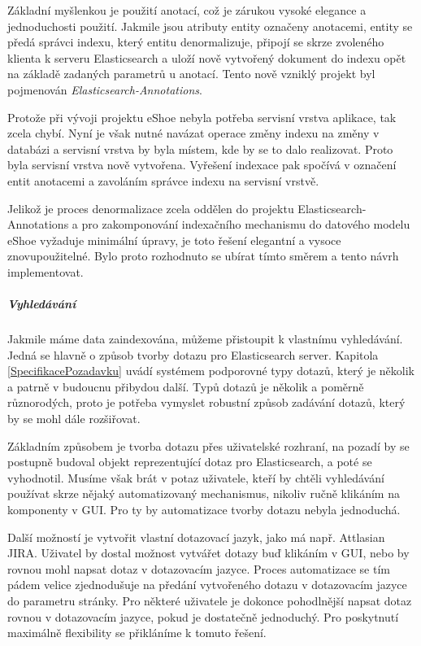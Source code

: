 \documentclass[11pt,oneside]{fithesis2}
\begin{document}
Základní myšlenkou je použití anotací, což je zárukou vysoké elegance a jednoduchosti použití. Jakmile jsou atributy entity označeny anotacemi, entity se předá správci indexu, který entitu denormalizuje, připojí se skrze zvoleného klienta k serveru Elasticsearch a uloží nově vytvořený dokument do indexu opět na základě zadaných parametrů u anotací. Tento nově vzniklý projekt byl pojmenován \emph{Elasticsearch-Annotations}.

Protože při vývoji projektu eShoe nebyla potřeba servisní vrstva aplikace, tak zcela chybí. Nyní je však nutné navázat operace změny indexu na změny v databázi a servisní vrstva by byla místem, kde by se to dalo realizovat. Proto byla servisní vrstva nově vytvořena. Vyřešení indexace pak spočívá v označení entit anotacemi a zavoláním správce indexu na servisní vrstvě. 

Jelikož je proces denormalizace zcela oddělen do projektu Elasticsearch-Annotations a pro zakomponování indexačního mechanismu do datového modelu eShoe vyžaduje minimální úpravy, je toto řešení elegantní a vysoce znovupoužitelné. Bylo proto rozhodnuto se ubírat tímto směrem a tento návrh implementovat.

\subparagraph{Vyhledávání}
Jakmile máme data zaindexována, můžeme přistoupit k vlastnímu vyhledávání. Jedná se hlavně o způsob tvorby dotazu pro Elasticsearch server. Kapitola \ref{SpecifikacePozadavku} uvádí systémem podporovné typy dotazů, který je několik a patrně v budoucnu přibydou další. Typů dotazů je několik a poměrně různorodých, proto je potřeba vymyslet robustní způsob zadávání dotazů, který by se mohl dále rozšiřovat.

Základním způsobem je tvorba dotazu přes uživatelské rozhraní, na pozadí by se postupně budoval objekt reprezentující dotaz pro Elasticsearch, a poté se vyhodnotil. Musíme však brát v potaz uživatele, kteří by chtěli vyhledávání používat skrze nějaký automatizovaný mechanismus, nikoliv ručně klikáním na komponenty v GUI. Pro ty by automatizace tvorby dotazu nebyla jednoduchá.

Další možností je vytvořit vlastní dotazovací jazyk, jako má např. Attlasian JIRA. Uživatel by dostal možnost vytvářet dotazy buď klikáním v GUI, nebo by rovnou mohl napsat dotaz v dotazovacím jazyce. Proces automatizace se tím pádem velice zjednodušuje na předání vytvořeného dotazu v dotazovacím jazyce do parametru stránky. Pro některé uživatele je dokonce pohodlnější napsat dotaz rovnou v dotazovacím jazyce, pokud je dostatečně jednoduchý. Pro poskytnutí maximálně flexibility se přikláníme k tomuto řešení.
\end{document}
